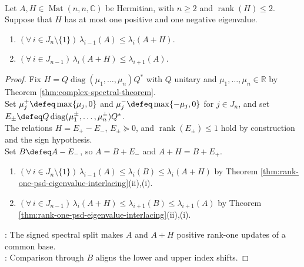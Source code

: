 \begin{corollary} \label{cor:rank-two-one-positive-one-negative-interlacing} \\
Let $A,H\in\operatorname{Mat}(n,n,\mathbb{C})$ be Hermitian, with $n\geq2$ and $\operatorname{rank}(H)\leq2$. Suppose that $H$ has at most one positive and one negative eigenvalue.
\begin{enumerate}[label=(\roman*)]
\setlength{\itemsep}{0pt}
\item $(\forall\,i\in J_n\setminus\{1\})\,\lambda_{i-1}(A)\leq\lambda_i(A+H)$.
\item $(\forall\,i\in J_{n-1})\,\lambda_i(A+H)\leq\lambda_{i+1}(A)$.
\end{enumerate}
\begin{proof}
Fix $H=Q\operatorname{diag}(\mu_1,\ldots,\mu_n)Q^*$ with $Q$ unitary and $\mu_1,\ldots,\mu_n\in\mathbb{R}$ by Theorem \ref{thm:complex-spectral-theorem}.\\
Set $\mu_j^+\defeq\max\{\mu_j,0\}$ and $\mu_j^-\defeq\max\{-\mu_j,0\}$ for $j\in J_n$, and set $E_\pm\defeq Q\operatorname{diag}(\mu_1^\pm,\ldots,\mu_n^\pm)Q^*$.\\
The relations $H=E_+-E_-$, $E_\pm\succeq0$, and $\operatorname{rank}(E_\pm)\leq1$ hold by construction and the sign hypothesis.\\
Set $B\defeq A-E_-$, so $A=B+E_-$ and $A+H=B+E_+$.
\begin{enumerate}[label=(\roman*)]
\setlength{\itemsep}{0pt}
\item $(\forall\,i\in J_n\setminus\{1\})\,\lambda_{i-1}(A)\leq\lambda_i(B)\leq\lambda_i(A+H)$ by Theorem \ref{thm:rank-one-psd-eigenvalue-interlacing}(ii),(i).
\item $(\forall\,i\in J_{n-1})\,\lambda_i(A+H)\leq\lambda_{i+1}(B)\leq\lambda_{i+1}(A)$ by Theorem \ref{thm:rank-one-psd-eigenvalue-interlacing}(ii),(i).
\end{enumerate}
: The signed spectral split makes $A$ and $A+H$ positive rank-one updates of a common base.\\
: Comparison through $B$ aligns the lower and upper index shifts.
\end{proof}
\end{corollary}


